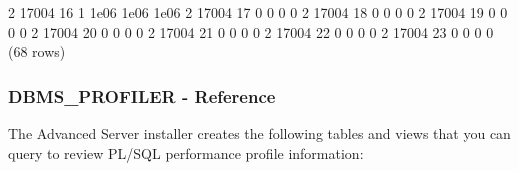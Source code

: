 \documentclass[letterpaper,10pt,english,openany,oneside]{sphinxmanual}
\begin{document}
\begin{sphinxVerbatim}[commandchars=\\\{\}]
     2 \textbar{}       17004 \textbar{}    16 \textbar{}           1 \textbar{}      1e\PYGZhy{}06 \textbar{}    1e\PYGZhy{}06 \textbar{}    1e\PYGZhy{}06 \textbar{}        \textbar{}        \textbar{}        \textbar{}
     2 \textbar{}       17004 \textbar{}    17 \textbar{}           0 \textbar{}          0 \textbar{}        0 \textbar{}        0 \textbar{}        \textbar{}        \textbar{}        \textbar{}
     2 \textbar{}       17004 \textbar{}    18 \textbar{}           0 \textbar{}          0 \textbar{}        0 \textbar{}        0 \textbar{}        \textbar{}        \textbar{}        \textbar{}
     2 \textbar{}       17004 \textbar{}    19 \textbar{}           0 \textbar{}          0 \textbar{}        0 \textbar{}        0 \textbar{}        \textbar{}        \textbar{}        \textbar{}
     2 \textbar{}       17004 \textbar{}    20 \textbar{}           0 \textbar{}          0 \textbar{}        0 \textbar{}        0 \textbar{}        \textbar{}        \textbar{}        \textbar{}
     2 \textbar{}       17004 \textbar{}    21 \textbar{}           0 \textbar{}          0 \textbar{}        0 \textbar{}        0 \textbar{}        \textbar{}        \textbar{}        \textbar{}
     2 \textbar{}       17004 \textbar{}    22 \textbar{}           0 \textbar{}          0 \textbar{}        0 \textbar{}        0 \textbar{}        \textbar{}        \textbar{}        \textbar{}
     2 \textbar{}       17004 \textbar{}    23 \textbar{}           0 \textbar{}          0 \textbar{}        0 \textbar{}        0 \textbar{}        \textbar{}        \textbar{}        \textbar{}
(68 rows)
\end{sphinxVerbatim}

\newpage


\subsubsection{DBMS\_PROFILER - Reference}
\label{\detokenize{dbms_profiler:dbms-profiler-reference}}
The Advanced Server installer creates the following tables and views
that you can query to review PL/SQL performance profile information:
\end{document}
